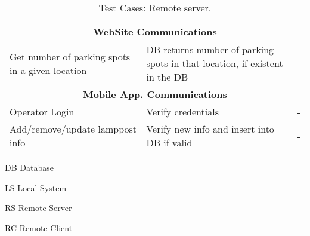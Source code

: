 \begin{table}[H]
\begin{threeparttable}
{\begin{tabular}{|m{4cm}|m{5cm}||m{5cm}|}
			\multicolumn{3}{c}{\textbf{WebSite Communications}}\\\hline
			Get number of parking spots in a given location & DB returns number of parking spots in that location, if existent in the DB & -
			\\\hline
			
			\multicolumn{3}{c}{\textbf{Mobile App. Communications}}\\\hline
			Operator Login & Verify credentials & -
			\\\hline
			Add/remove/update lamppost info & Verify new info and insert into DB if valid & -
			\\\hline
		\end{tabular}
	}
	
		\begin{tablenotes}
			\small
			\item[DB]Database
			\item[LS]Local System
			\item[RS]Remote Server
			\item[RC]Remote Client
		\end{tablenotes}
	\end{threeparttable}

	\caption{Test Cases: Remote server.}
	\label{table:test_rs}
\end{table}
